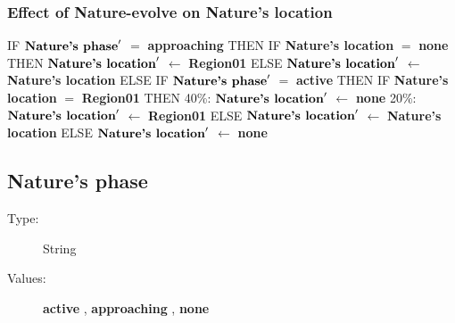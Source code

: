 \documentclass{article}%
\begin{document}
\subsubsection{Effect of Nature{-}evolve on Nature's location}%
\label{ssubsec:Effect of Nature{-}evolve on Nature's location}%
\begin{flushleft}%
IF %
$\mbox{\textbf{Nature's phase}} '$%
$=$%
\textbf{approaching}%
\linebreak%
\hspace*{2em}%
THEN %
IF %
\textbf{Nature's location}%
$=$%
\textbf{none}%
\linebreak%
\hspace*{4em}%
THEN %
$\mbox{\textbf{Nature's location}} '$%
$\leftarrow$%
\textbf{Region01}%
\linebreak%
\hspace*{4em}%
ELSE %
$\mbox{\textbf{Nature's location}} '$%
$\leftarrow$%
\textbf{Nature's location}%
\linebreak%
\hspace*{2em}%
ELSE %
IF %
$\mbox{\textbf{Nature's phase}} '$%
$=$%
\textbf{active}%
\linebreak%
\hspace*{4em}%
THEN %
IF %
\textbf{Nature's location}%
$=$%
\textbf{Region01}%
\linebreak%
\hspace*{6em}%
THEN %
\linebreak%
\hspace*{8em}%
40\%: %
$\mbox{\textbf{Nature's location}} '$%
$\leftarrow$%
\textbf{none}%
\linebreak%
\hspace*{8em}%
20\%: %
$\mbox{\textbf{Nature's location}} '$%
$\leftarrow$%
\textbf{Region01}%
\linebreak%
\hspace*{6em}%
ELSE %
$\mbox{\textbf{Nature's location}} '$%
$\leftarrow$%
\textbf{Nature's location}%
\linebreak%
\hspace*{4em}%
ELSE %
$\mbox{\textbf{Nature's location}} '$%
$\leftarrow$%
\textbf{none}%
\end{flushleft}

%
\subsection{Nature's phase}%
\label{subsec:Nature's phase}%
\begin{description}%
\item[Type:]%
String%
\item[Values:]%
\textbf{active}%
, %
\textbf{approaching}%
, %
\textbf{none}%
\end{description}%
\end{document}
